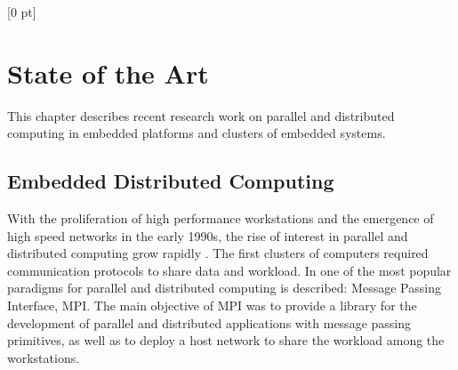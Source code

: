 \titlespacing{\chapter}{0 pt}{30 pt}{50 pt}[0 pt]
\titleformat{\section}{\Large\bfseries}{\thesection}{0 pt}{\hspace{30 pt}}
\titleformat{\subsection}{\large\bfseries}{\thesubsection}{0 pt}{\hspace{30 pt}}
\pagestyle{fancy}
\fancyhead[LO,LE]{\footnotesize\textit{\leftmark}}
\fancyhead[RO,RE]{\thepage}
\fancyfoot[CO,CE]{}

\chapter{State of the Art} %

\normalsize

\noindent

This chapter describes recent research work on parallel and distributed 
computing in embedded platforms and clusters of embedded systems.

\section{Embedded Distributed Computing}

With the proliferation of high performance workstations and the emergence of
high speed networks in the early 1990s, the rise of interest in parallel and
distributed computing grow rapidly . The first clusters of computers required
communication protocols to share data and workload. In \cite{Salim} one of the
most popular paradigms for parallel and distributed computing is described:
Message Passing Interface, MPI. The main objective of MPI was to provide a
library for the development of parallel and distributed applications with
message passing primitives, as well as to deploy a host network to share the
workload among the workstations.


